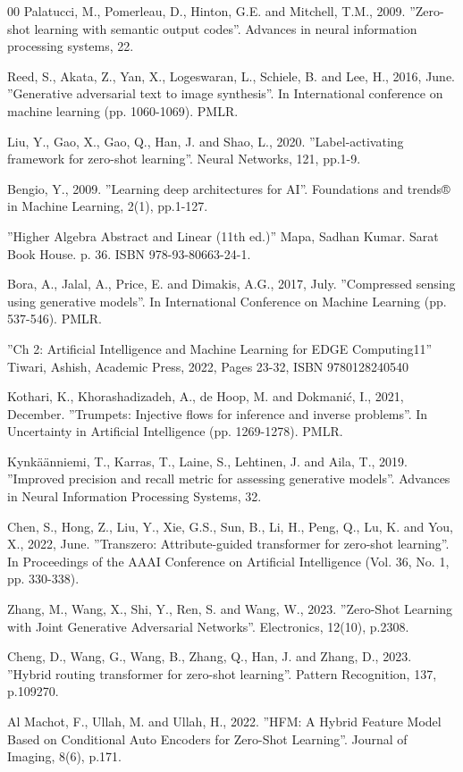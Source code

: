 \documentclass{article}
\begin{document}
\begin{thebibliography}{00}
 Palatucci, M., Pomerleau, D., Hinton, G.E. and Mitchell, T.M., 2009. ''Zero-shot learning with semantic output codes''. Advances in neural information processing systems, 22.

 Reed, S., Akata, Z., Yan, X., Logeswaran, L., Schiele, B. and Lee, H., 2016, June. ''Generative adversarial text to image synthesis''. In International conference on machine learning (pp. 1060-1069). PMLR.

 Liu, Y., Gao, X., Gao, Q., Han, J. and Shao, L., 2020. ''Label-activating framework for zero-shot learning''. Neural Networks, 121, pp.1-9.

 Bengio, Y., 2009. ''Learning deep architectures for AI''. Foundations and trends® in Machine Learning, 2(1), pp.1-127.

 ''Higher Algebra Abstract and Linear (11th ed.)'' Mapa, Sadhan Kumar. Sarat Book House. p. 36. ISBN 978-93-80663-24-1.

 Bora, A., Jalal, A., Price, E. and Dimakis, A.G., 2017, July. ''Compressed sensing using generative models''. In International Conference on Machine Learning (pp. 537-546). PMLR.

 ''Ch 2: Artificial Intelligence and Machine Learning for EDGE Computing11'' Tiwari, Ashish, Academic Press, 2022, Pages 23-32, ISBN 9780128240540

 Kothari, K., Khorashadizadeh, A., de Hoop, M. and Dokmanić, I., 2021, December. ''Trumpets: Injective flows for inference and inverse problems''. In Uncertainty in Artificial Intelligence (pp. 1269-1278). PMLR.

 Kynkäänniemi, T., Karras, T., Laine, S., Lehtinen, J. and Aila, T., 2019. ''Improved precision and recall metric for assessing generative models''. Advances in Neural Information Processing Systems, 32.

 Chen, S., Hong, Z., Liu, Y., Xie, G.S., Sun, B., Li, H., Peng, Q., Lu, K. and You, X., 2022, June. ''Transzero: Attribute-guided transformer for zero-shot learning''. In Proceedings of the AAAI Conference on Artificial Intelligence (Vol. 36, No. 1, pp. 330-338).

 Zhang, M., Wang, X., Shi, Y., Ren, S. and Wang, W., 2023. ''Zero-Shot Learning with Joint Generative Adversarial Networks''. Electronics, 12(10), p.2308.

 Cheng, D., Wang, G., Wang, B., Zhang, Q., Han, J. and Zhang, D., 2023. ''Hybrid routing transformer for zero-shot learning''. Pattern Recognition, 137, p.109270.

 Al Machot, F., Ullah, M. and Ullah, H., 2022. ''HFM: A Hybrid Feature Model Based on Conditional Auto Encoders for Zero-Shot Learning''. Journal of Imaging, 8(6), p.171.

\end{thebibliography}
\end{document}
